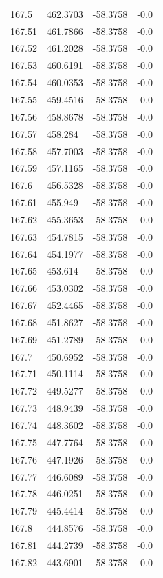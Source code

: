 \begin{table}[H]
\begin{tabular}{llll}
167.5 & 462.3703 & -58.3758 & -0.0 \\
167.51 & 461.7866 & -58.3758 & -0.0 \\
167.52 & 461.2028 & -58.3758 & -0.0 \\
167.53 & 460.6191 & -58.3758 & -0.0 \\
167.54 & 460.0353 & -58.3758 & -0.0 \\
167.55 & 459.4516 & -58.3758 & -0.0 \\
167.56 & 458.8678 & -58.3758 & -0.0 \\
167.57 & 458.284 & -58.3758 & -0.0 \\
167.58 & 457.7003 & -58.3758 & -0.0 \\
167.59 & 457.1165 & -58.3758 & -0.0 \\
167.6 & 456.5328 & -58.3758 & -0.0 \\
167.61 & 455.949 & -58.3758 & -0.0 \\
167.62 & 455.3653 & -58.3758 & -0.0 \\
167.63 & 454.7815 & -58.3758 & -0.0 \\
167.64 & 454.1977 & -58.3758 & -0.0 \\
167.65 & 453.614 & -58.3758 & -0.0 \\
167.66 & 453.0302 & -58.3758 & -0.0 \\
167.67 & 452.4465 & -58.3758 & -0.0 \\
167.68 & 451.8627 & -58.3758 & -0.0 \\
167.69 & 451.2789 & -58.3758 & -0.0 \\
167.7 & 450.6952 & -58.3758 & -0.0 \\
167.71 & 450.1114 & -58.3758 & -0.0 \\
167.72 & 449.5277 & -58.3758 & -0.0 \\
167.73 & 448.9439 & -58.3758 & -0.0 \\
167.74 & 448.3602 & -58.3758 & -0.0 \\
167.75 & 447.7764 & -58.3758 & -0.0 \\
167.76 & 447.1926 & -58.3758 & -0.0 \\
167.77 & 446.6089 & -58.3758 & -0.0 \\
167.78 & 446.0251 & -58.3758 & -0.0 \\
167.79 & 445.4414 & -58.3758 & -0.0 \\
167.8 & 444.8576 & -58.3758 & -0.0 \\
167.81 & 444.2739 & -58.3758 & -0.0 \\
167.82 & 443.6901 & -58.3758 & -0.0 \\

\end{tabular}
\end{table}
